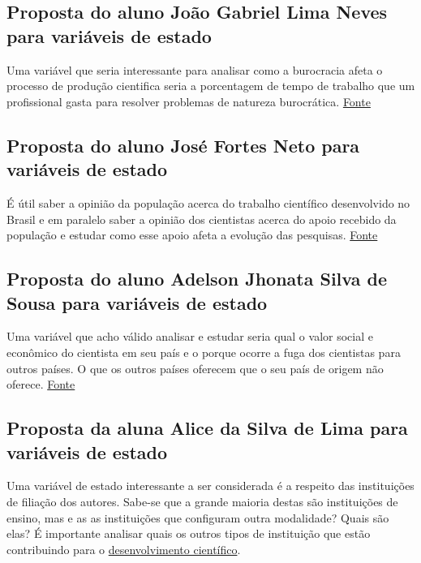 \subsection{Proposta do aluno João Gabriel Lima Neves para variáveis de estado}
Uma variável que seria interessante para analisar como a burocracia afeta o processo de produção cientifica seria a porcentagem de tempo de trabalho que um profissional gasta para resolver problemas de natureza burocrática. \href{https://humanas.blog.scielo.org/blog/2020/04/07/como-aliviar-a-burocracia-na-pesquisa-cientifica/#.YTFdi3VKhhE}{Fonte}

\subsection{Proposta do aluno José Fortes Neto para variáveis de estado}

É útil saber a opinião da população acerca do trabalho científico desenvolvido no Brasil e em paralelo saber a opinião dos cientistas acerca do apoio recebido da população e estudar como esse apoio afeta a evolução das pesquisas. \href{https://www.periodicosdeminas.ufmg.br/entenda-os-atuais-desafios-das-pesquisas-cientificas/}{Fonte}

\subsection{Proposta do aluno Adelson Jhonata Silva de Sousa para variáveis de estado}
Uma variável que acho válido analisar e estudar seria qual o valor social e econômico do cientista em seu país e o porque ocorre a fuga dos cientistas para outros países. O que os outros países oferecem que o seu país de origem não oferece. \href{https://www.bbc.com/portuguese/brasil-51110626}{Fonte}

\subsection{Proposta da aluna Alice da Silva de Lima para variáveis de estado}
Uma variável de estado interessante a ser considerada é a respeito das instituições de filiação dos autores. Sabe-se que a grande maioria destas são instituições de ensino, mas e as as instituições que configuram outra modalidade? Quais são elas?
É importante analisar quais os outros tipos de instituição que estão contribuindo para o \href{https://www.ipea.gov.br/cts/pt/central-de-conteudo/artigos/artigos/116-a-ciencia-e-a-tecnologia-como-estrategia-de-desenvolvimento}{desenvolvimento científico}.

